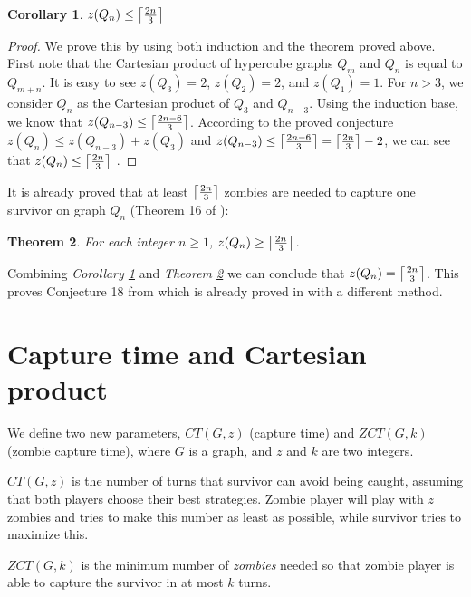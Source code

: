 \documentclass[1p]{elsarticle}
\DeclarePairedDelimiter\ceil{\lceil}{\rceil} \DeclarePairedDelimiter\floor{\lfloor}{\rfloor}
\newtheorem{theorem}{Theorem}
\newtheorem{corollary}[theorem]{Corollary}
\begin{document}
\begin{corollary}
	\label{C3}
	$z(Q_{n}) \leq \ceil*{\frac{2n}{3}}$
\end{corollary}
\begin{proof}
	We prove this by using both induction and the theorem proved above. First note that the Cartesian product of
	hypercube graphs $Q_{m}$ and $Q_{n}$ is equal to $Q_{m+n}$. It is easy to see $z(Q_3) = 2$, $z(Q_2) = 2$, and
	$z(Q_1) = 1$. For $n > 3$, we consider $Q_n$ as the Cartesian product of $Q_3$ and $Q_{n-3}$. Using the induction
	base, we know that $z(Q_{n-3}) \leq \ceil*{\frac{2n - 6}{3}}$.  According to the proved conjecture $z(Q_n) \leq
	z(Q_{n-3}) + z(Q_3)$ and $z(Q_{n-3}) \leq \ceil*{\frac{2n - 6}{3}} = \ceil*{\frac{2n}{3}} - 2$, we can see that
	$z(Q_n) \leq \ceil*{\frac{2n}{3}}$ .
\end{proof}

It is already proved that at least $\ceil*{\frac{2n}{3}}$ zombies are needed to capture one survivor on graph $Q_n$
(Theorem 16 of \cite{Fitz16}):

\begin{theorem}
	\label{T4}
	For each integer $n \geq 1$, $z(Q_n) \geq \ceil*{\frac{2n}{3}} $.
\end{theorem}

Combining {\it Corollary \ref{C3}} and {\it Theorem \ref{T4}} we can conclude that $z(Q_n)  = \ceil*{\frac{2n}{3}}$.
This proves Conjecture 18 from \cite{Fitz16} which is already proved in \cite{Offner19} with a different method. 
	

\section{Capture time and Cartesian product}\label{capturetime}
	We define two new parameters, $CT(G,z)$ (capture time) and $ZCT(G,k)$ (zombie capture time), where $G$ is a graph,
	and $z$ and $k$ are two integers.
	
	$CT(G,z)$ is the number of turns that survivor can avoid being caught, assuming that both players choose their best
	strategies. Zombie player will play with $z$ zombies and tries to make this number as least as possible, while
	survivor tries to maximize this.

	$ZCT(G,k)$ is the minimum number of {\it zombies} needed so that zombie player is able to capture the survivor in at
	most $k$ turns.
\end{document}
